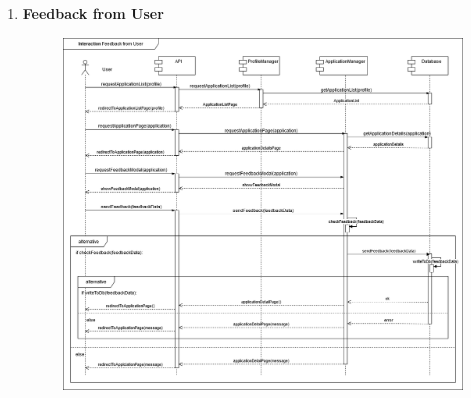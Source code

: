 \begin{enumerate}
    \newpage
    \item \textbf{Feedback from User}
    \begin{figure}[h!]
            \centering  \includegraphics[width=1\textwidth]{DD/Images/Interactions/INT16_ FeedbackFromUser.drawio.png}
            \label{fig:ComponentViewDiagram}
    \end{figure}
            

\end{enumerate}
